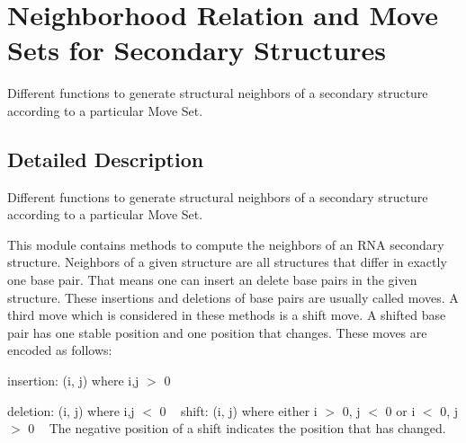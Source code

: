 \hypertarget{group__neighbors}{}\section{Neighborhood Relation and Move Sets for Secondary Structures}
\label{group__neighbors}


Different functions to generate structural neighbors of a secondary structure according to a particular Move Set.  




\subsection{Detailed Description}
Different functions to generate structural neighbors of a secondary structure according to a particular Move Set. 

This module contains methods to compute the neighbors of an R\+NA secondary structure. Neighbors of a given structure are all structures that differ in exactly one base pair. That means one can insert an delete base pairs in the given structure. These insertions and deletions of base pairs are usually called moves. A third move which is considered in these methods is a shift move. A shifted base pair has one stable position and one position that changes. These moves are encoded as follows\+: ~\newline

\begin{DoxyItemize}
\item insertion\+: (i, j) where i,j $>$ 0 ~\newline

\item deletion\+: (i, j) where i,j $<$ 0 ~\newline
 shift\+: (i, j) where either i $>$ 0, j $<$ 0 or i $<$ 0, j $>$ 0 ~\newline
 The negative position of a shift indicates the position that has changed.
\end{DoxyItemize}


\begin{DoxyCode}{0}
\DoxyCodeLine{}
\end{DoxyCode}


